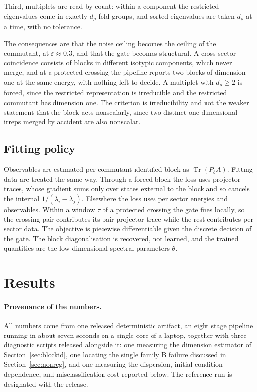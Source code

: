 \documentclass[10pt,a4paper]{amsart}
\newcommand{\Tr}{\operatorname{Tr}}
\begin{document}
Third, multiplets are read by count: within a component the restricted
eigenvalues come in exactly $d_\rho$ fold groups, and sorted eigenvalues are
taken $d_\rho$ at a time, with no tolerance.

The consequences are that the noise ceiling becomes the ceiling of the commutant,
at $\varepsilon\approx0.3$, and that the gate becomes structural. A cross sector
coincidence consists of blocks in different isotypic components, which never
merge, and at a protected crossing the pipeline reports two blocks of dimension
one at the same energy, with nothing left to decide. A multiplet with
$d_\rho\ge2$ is forced, since the restricted representation is irreducible and
the restricted commutant has dimension one. The criterion is irreducibility and
not the weaker statement that the block acts nonscalarly, since two distinct one
dimensional irreps merged by accident are also nonscalar.

\subsection{Fitting policy}
Observables are estimated per commutant identified block as $\Tr(P_bA)$. Fitting
data are treated the same way. Through a forced block the loss uses projector
traces, whose gradient sums only over states external to the block and so cancels
the internal $1/(\lambda_i-\lambda_j)$. Elsewhere the loss uses per sector
energies and observables. Within a window $\tau$ of a protected crossing the gate
fires locally, so the crossing pair contributes its pair projector trace while the
rest contributes per sector data. The objective is piecewise differentiable given
the discrete decision of the gate. The block diagonalisation is recovered, not
learned, and the trained quantities are the low dimensional spectral parameters
$\theta$.

\section{Results}\label{sec:results}
\paragraph{Provenance of the numbers.}
All numbers come from one released deterministic artifact, an eight stage pipeline running in about seven seconds on a single core of a laptop, together with three diagnostic scripts released alongside it: one measuring the dimension estimator of Section~\ref{sec:blockid}, one locating the single family B failure discussed in Section~\ref{sec:nonreg}, and one measuring the dispersion, initial condition dependence, and misclassification cost reported below. The reference run is
designated with the release.
\end{document}
